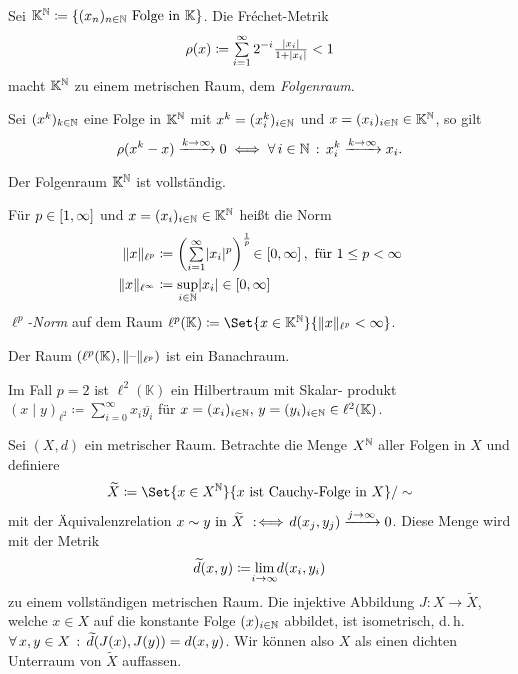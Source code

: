 \documentclass{cheat-sheet}
\newcommand{\K}{\mathbb{K}}
\newcommand{\scp}[2]{\left( #1 \!\mid\! #2 \right)} %
\newcommand{\convWith}[1]{\xrightarrow{#1 \to \infty}} %
\begin{document}
\begin{defn}
  Sei $\K^\N \coloneqq \{ (x_n)_{n \in \N} \text{ Folge in } \K \}$. Die Fréchet-Metrik
    \[ \rho(x) \coloneqq \sum_{i = 1}^\infty 2^{-i} \tfrac{ \abs{x_i} }{ 1 + \abs{x_i} } < 1 \]
  macht $\K^\N$ zu einem metrischen Raum, dem \emph{Folgenraum}.
\end{defn}

\begin{satz}
  Sei $(x^k)_{k \in \mathbb{N}}$ eine Folge in $\K^\N$ mit $x^k = (x^k_i)_{i \in \mathbb{N}}$ und $x = (x_i)_{i \in \N} \in \K^\N$, so gilt
  \[ \rho(x^k - x) \convWith{k} 0 \iff \fa{i \in \N} x_i^k \convWith{k} x_i. \]
\end{satz}

\begin{satz}
  Der Folgenraum $\K^\N$ ist vollständig.
\end{satz}

\begin{defn}
  Für $p \in \left[ 1, \infty \right]$ und $x = (x_i)_{i \in \N} \in \K^\N$ heißt die Norm
  \begin{align*}
    \norm{x}_{\ell^p} &\coloneqq \left( \sum_{i=1}^\infty \abs{x_i}^p \right)^{\frac{1}{p}} \!\in \cinterval{0}{\infty}, \text{ für } 1 \leq p < \infty \\
    \norm{x}_{\ell^\infty} &\coloneqq \sup_{i \in \N} \abs{x_i} \in \cinterval{0}{\infty}
  \end{align*}
  \emph{$\ell^p$-Norm} auf dem Raum $\ell^p(\K) \coloneqq \Set{ x \in \K^\N }{ \norm{x}_{\ell^p} < \infty }$.
\end{defn}

\begin{satz}
  Der Raum $(\ell^p(\K), \norm{\blank}_{\ell^p})$ ist ein Banachraum.
\end{satz}

\begin{bem}
  Im Fall $p {=} 2$ ist $\ell^2(\K)$ ein Hilbertraum mit Skalar- produkt $\scp{x}{y}_{\ell^2} \coloneqq \sum_{i = 0}^\infty x_i \overline{y_i}$ für $x = (x_i)_{i \in \N}, \, y = (y_i)_{i \in \N} \in \ell^2(\K)$.
\end{bem}


\begin{satz}[Vervollständigung]
  Sei $(X, d)$ ein metrischer Raum. Betrachte die Menge $X^{\mathbb{N}}$ aller Folgen in $X$ und definiere
  \[ \widetilde{X} \coloneqq \Set{ x \in X^\N }{ x \text{ ist Cauchy-Folge in } X }/\sim \]
  mit der Äquivalenzrelation $x \sim y \text{ in } \widetilde{X} \!\coloniff\! d(x_j, y_j) \convWith{j} 0$.
  Diese Menge wird mit der Metrik
  \[ \widetilde{d}(x, y) \coloneqq \lim_{\mathclap{i \to \infty}} d(x_i, y_i) \]
  zu einem vollständigen metrischen Raum. Die injektive Abbildung $J : X \to \tilde{X}$, welche $x \in X$ auf die konstante Folge $(x)_{i \in \mathbb{N}}$ abbildet, ist isometrisch, d.\,h.
  $\forall \, {x, y \in X} \,:\, \widetilde{d}(J(x), J(y)) = d(x, y)$.
  Wir können also $X$ als einen dichten Unterraum von $\widetilde{X}$ auffassen.
\end{satz}
\end{document}
